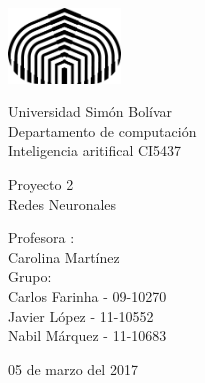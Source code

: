 

\begin{titlepage}

\setlength{\hoffset}{-4cm}
\setlength{\voffset}{-1in}
\setlength{\topmargin}{1.5cm}
\setlength{\headheight}{0.5cm}
\setlength{\headsep}{1cm}
\setlength{\oddsidemargin}{3cm}
\setlength{\evensidemargin}{3cm}
\setlength{\footskip}{1.5cm}
\enlargethispage{1cm}

\fontsize{12pt}{14pt}
\selectfont

\begin{center}

\includegraphics[height=2cm]{logo.png}

\vspace{0.5cm}

Universidad Sim\'on Bol\'ivar\\
Departamento de computaci\'on\\
Inteligencia aritifical CI5437\\

\vspace{3.5cm}

\fontsize{17.28pt}{21pt}
\selectfont

Proyecto 2 \\
Redes Neuronales\\

\fontsize{12pt}{14pt}
\selectfont

\vspace{.6cm}



\vspace{.4cm}


\vspace{3cm}

Profesora : \\
Carolina Mart\'inez\\
\vspace{1cm}
Grupo: \\
Carlos Farinha   - 09-10270 \\
Javier L\'opez     - 11-10552 \\
Nabil  M\'arquez  - 11-10683 \\


\vspace{1cm}

05 de marzo del 2017

\end{center}
\end{titlepage}

